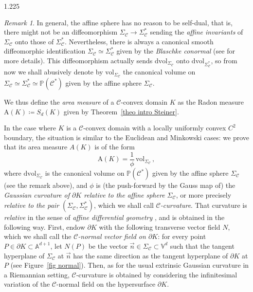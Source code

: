 \documentclass[reqno, a4paper]{amsart}
\numberwithin{equation}{section}
\numberwithin{figure}{section}
\theoremstyle{definition}
\theoremstyle{remark}
\newtheorem{remark}[theorem]{Remark}
\newcommand{\V}{\mathbb{V}} %
\newcommand{\A}{\mathbb{A}} %
\renewcommand{\P}{\mathbb{P}} %
\newcommand{\dif}{\mathrm{d}} %
\newcommand{\C}{\mathcal{C}} %
\renewcommand{\S}{\Sigma_\C} %
\newcommand{\vol}{\mathrm{vol}} %
\newcommand{\dvol}{\dif \mathrm{vol}} %
\newcommand{\Area}{\mathrm{A}} %
\begin{document}
\begin{spacing}{1.225}
\begin{remark}
In general, the affine sphere has no reason to be self-dual, that is, there might not be an diffeomorphism $\S \to \S^*$ sending the \emph{affine invariants} of $\S$ onto those of $\S^*$. Nevertheless, there is always a canonical smooth diffeomorphic identification $\S \simeq \S^*$ given by the \emph{Blaschke conormal} (see \cite{Loftin_10} for more details). This diffeomorphism actually sends $\dvol_{\S}$ onto $\dvol_{\S^*}$, so from now we shall abusively denote by $\vol_{\S}$ the canonical volume on $\S \simeq \S^* \simeq\P(\C^*)$ given by the affine sphere $\S$.
\end{remark}

We thus define the \emph{area measure} of a $\C$-convex domain $K$ as the Radon measure $\Area(K) \coloneqq S_d(K)$ given by Theorem~\ref{theo intro Steiner}.

In the case where $K$ is a $\C$-convex domain with a locally uniformly convex $C^2$ boundary, the situation is similar to the Euclidean and Minkowski cases: we prove that its area measure $A(K)$ is of the form 
\begin{equation*}
 \Area(K) = \frac{1}{\phi} \, \vol_{\S} \, ,
\end{equation*}
where $\dvol_{\S}$ is the canonical volume on $\P(\C^*)$ given by the affine sphere $\S$ (see the remark above), and $\phi$ is (the push-forward by the Gauss map of) the \emph{Gaussian curvature of $\partial K$ relative to the affine sphere $\S$}, or more precisely \emph{relative to the pair $(\S,\S^*)$}, which we shall call \emph{$\C$-curvature}. That curvature is \emph{relative} in the sense of \emph{affine differential geometry} \cite{LSZH_15}, and is obtained in the following way. First, endow $\partial K$ with the following transverse vector field $N$, which we shall call the \emph{$\C$-normal vector field on $\partial K$}: for every point $P \in \partial K \subset \A^{d+1}$, let $N(P)$ be the vector $\vec{n} \in \S \subset \V^d$ such that the tangent hyperplane of $\S$ at $\vec{n}$ has the same direction as the tangent hyperplane of $\partial K $ at $P$ (see Figure~\ref{fig normal}). Then, as for the usual extrinsic Gaussian curvature in a Riemannian setting, $\C$-curvature is obtained by considering the infinitesimal variation of the $\C$-normal field on the hypersurface $\partial K$. 


\end{spacing}
\end{document}
